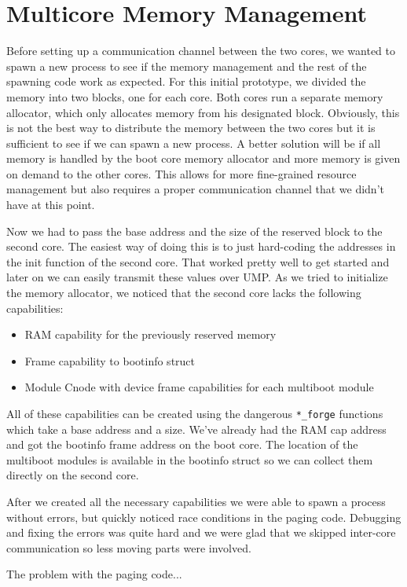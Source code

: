 \section{Multicore Memory Management}

Before setting up a communication channel between the two cores, we wanted to spawn a new process to see if the 
memory management and the rest of the spawning code work as expected. For this initial prototype, we divided 
the memory into two blocks, one for each core. Both cores run a separate memory allocator, which only allocates 
memory from his designated block. Obviously, this is not the best way to distribute the memory between the two 
cores but it is sufficient to see if we can spawn a new process. A better solution will be if all memory is 
handled by the boot core memory allocator and more memory is given on demand to the other cores. This allows 
for more fine-grained resource management but also requires a proper communication channel that we didn't have 
at this point.

Now we had to pass the base address and the size of the reserved block to the second core. The easiest way of 
doing this is to just hard-coding the addresses in the init function of the second core. That worked pretty well 
to get started and later on we can easily transmit these values over UMP. As we tried to initialize the memory 
allocator, we noticed that the second core lacks the following capabilities: 
\begin{itemize}
    \item RAM capability for the previously reserved memory
    \item Frame capability to bootinfo struct
    \item Module Cnode with device frame capabilities for each multiboot module
\end{itemize}
All of these capabilities can be created using the dangerous \verb|*_forge| functions which take a base address 
and a size. We've already had the RAM cap address and got the bootinfo frame address on the boot core. The 
location of the multiboot modules is available in the bootinfo struct so we can collect them directly on the 
second core.

After we created all the necessary capabilities we were able to spawn a process without errors, but quickly 
noticed race conditions in the paging code. Debugging and fixing the errors was quite hard and we were glad that 
we skipped inter-core communication so less moving parts were involved.

The problem with the paging code...
 
